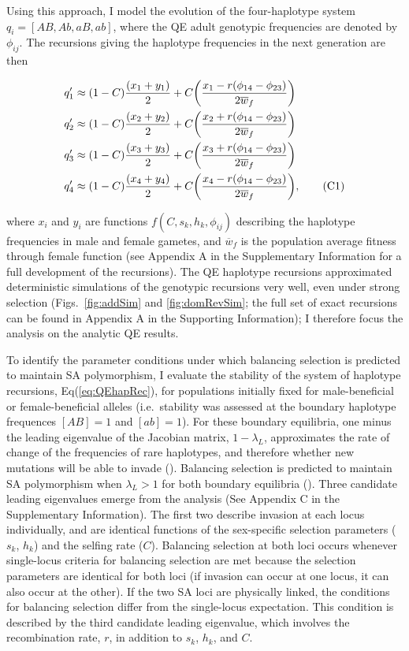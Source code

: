 \documentclass{article}
\newcommand\numberthis{\addtocounter{equation}{1}\tag{\theequation}}
\begin{document}
Using this approach, I model the evolution of the four-haplotype system $q_i = [AB, Ab, aB, ab]$, where the QE adult genotypic frequencies are denoted by $\phi_{ij}$. The recursions giving the haplotype frequencies in the next generation are then

\begin{align*} \label{eq:QEhapRec}
	q'_1 &\approx (1 - C) \frac{(x_1 + y_1)}{2} + C \bigg( \frac{x_1 - r(\phi_{14} - \phi_{23})}{2 \overline{w}_f} \bigg) \\
	q'_2 &\approx (1 - C) \frac{(x_2 + y_2)}{2} + C \bigg( \frac{x_2 + r(\phi_{14} - \phi_{23})}{2 \overline{w}_f} \bigg) \\
	q'_3 &\approx (1 - C) \frac{(x_3 + y_3)}{2} + C \bigg( \frac{x_3 + r(\phi_{14} - \phi_{23})}{2 \overline{w}_f} \bigg) \\
	q'_4 &\approx (1 - C) \frac{(x_4 + y_4)}{2} + C \bigg( \frac{x_4 - r(\phi_{14} - \phi_{23})}{2 \overline{w}_f} \bigg), \numberthis
\end{align*}

\noindent{} where $x_i$ and $y_i$ are functions $f(C, s_k, h_k, \phi_{ij})$ describing the haplotype frequencies in male and female gametes, and $\overline{w}_f$ is the population average fitness through female function (see Appendix A in the Supplementary Information for a full development of the recursions). The QE haplotype recursions approximated deterministic simulations of the genotypic recursions very well, even under strong selection (Figs.~\ref{fig:addSim} and \ref{fig:domRevSim}; the full set of exact recursions can be found in Appendix A in the Supporting Information); I therefore focus the analysis on the analytic QE results. 

To identify the parameter conditions under which balancing selection is predicted to maintain SA polymorphism, I evaluate the stability of the system of haplotype recursions, Eq(\ref{eq:QEhapRec}), for populations initially fixed for male-beneficial or female-beneficial alleles (i.e.~stability was assessed at the boundary haplotype frequences $[AB]=1$ and $[ab]=1$). For these boundary equilibria, one minus the leading eigenvalue of the Jacobian matrix, $1 - \lambda_L$, approximates the rate of change of the frequencies of rare haplotypes, and therefore whether new mutations will be able to invade (\citealt{OttoDay2007}). Balancing selection is predicted to maintain SA polymorphism when $\lambda_L > 1$ for both boundary equilibria (\citealt{Prout1968}). Three candidate leading eigenvalues emerge from the analysis (See Appendix C in the Supplementary Information). The first two describe invasion at each locus individually, and are identical functions of the sex-specific selection parameters ($s_k$, $h_k$) and the selfing rate ($C$). Balancing selection at both loci occurs whenever single-locus criteria for balancing selection are met because the selection parameters are identical for both loci (if invasion can occur at one locus, it can also occur at the other). If the two SA loci are physically linked, the conditions for balancing selection differ from the single-locus expectation. This condition is described by the third candidate leading eigenvalue, which involves the recombination rate, $r$, in addition to $s_k$, $h_k$, and $C$.
\end{document}
